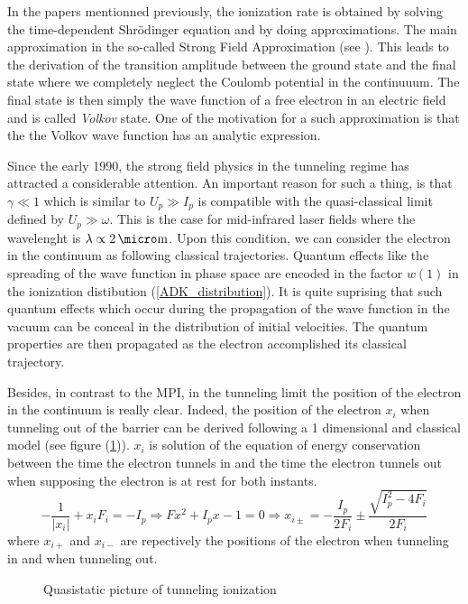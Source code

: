 \documentclass[a4paper]{article}
\begin{document}
In the papers mentionned previously, the ionization rate is obtained by solving the time-dependent Shr\"odinger equation and by doing approximations. The main approximation in the so-called Strong Field Approximation (see \cite{Misha_2014}). This leads to the derivation of the transition amplitude between the ground state and the final state where we completely neglect the Coulomb potential in the continuuum. The final state is then simply the wave function of a free electron in an electric field and is called \textit{Volkov} state. One of the motivation for a such approximation is that the the Volkov wave function has an analytic expression.
\par
Since the early 1990, the strong field physics in the tunneling regime has attracted a considerable attention. An important reason for such a thing, is that $\gamma \ll 1$ which is similar to $U_{p} \gg I_{p}$ is compatible with the quasi-classical limit defined by $U_{p} \gg \omega$. This is the case for mid-infrared laser fields where the wavelenght is $\lambda \propto 2\,\micro\text{m}$. Upon this condition, we can consider the electron in the continuum as following classical trajectories. Quantum effects like the spreading of the wave function in phase space are encoded in the factor $w(1)$ in the ionization distibution (\ref{ADK_distribution}). It is quite suprising that such quantum effects which occur during the propagation of the wave function in the vacuum can be conceal in the distribution of initial velocities. The quantum properties are then propagated as the electron accomplished its classical trajectory. 
\par
Besides, in contrast to the MPI, in the tunneling limit the position of the electron in the continuum is really clear.
Indeed, the position of the electron $x_{i}$ when tunneling out of the barrier can be derived following a 1 dimensional and classical model (see figure (\ref{tunneling_ionization})). $x_{i}$ is solution of the equation of energy conservation between the time the electron tunnels in and the time the electron tunnels out when supposing the electron is at rest for both instants.
\begin{equation}
-\frac{1}{| x_{i} |}+x_{i}F_{i}=-I_{p} \Rightarrow Fx^{2}+I_{p}x-1=0 \Rightarrow x_{i\pm}=-\frac{I_{p}}{2F_{i}}\pm\frac{\sqrt{I_{p}^{2}-4F_{i}}}{2F_{i}}
\end{equation} 
where $x_{i+}$ and $x_{i-}$ are repectively the positions of the electron when tunneling in and when tunneling out.

\begin{figure}[h] 
\centering
 
 \caption{Quasistatic picture of tunneling ionization}
 \label{tunneling_ionization} 
\end{figure}
\end{document}
